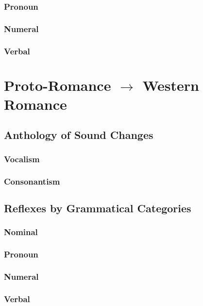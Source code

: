 \documentclass{report}
\begin{document}
\subsection{Pronoun}

\subsection{Numeral}

\subsection{Verbal}

\chapter{Proto-Romance $\rightarrow$ Western Romance}

\section{Anthology of Sound Changes}

\subsection{Vocalism}

\subsection{Consonantism}

\section{Reflexes by Grammatical Categories}

\subsection{Nominal}

\subsection{Pronoun}

\subsection{Numeral}

\subsection{Verbal}
\end{document}

